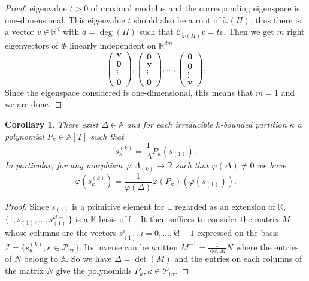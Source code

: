 \documentclass[10pt,a4paper]{amsart}
\newtheorem{coro}[theorem]{Corollary}
\theoremstyle{definition}
\DeclareMathOperator{\irr}{irr}
\begin{document}
\begin{proof}
eigenvalue $t>0$ of maximal modulus and the corresponding eigenspace is
one-dimensional. This eigenvalue $t$ should also be a root of $\widetilde
{\varphi}(\Pi)$, thus there is a vector $v\in\mathbb{R}^{d}$ with $d=\deg
(\Pi)$ such that $\mathcal{C}_{\widetilde{\varphi}(\Pi)}v=tv$. Then we get $m$
right eigenvectors of $\Phi$ linearly independent on $\mathbb{R}^{dm}$%
\[
\left(
\begin{matrix}
\boldsymbol{v}\\
\boldsymbol{0}\\
\vdots\\
\boldsymbol{0}%
\end{matrix}
\right) ,\left(
\begin{matrix}
\boldsymbol{0}\\
\boldsymbol{v}\\
\vdots\\
\boldsymbol{0}%
\end{matrix}
\right) ,\ldots,\left(
\begin{matrix}
\boldsymbol{0}\\
\boldsymbol{0}\\
\vdots\\
\boldsymbol{v}%
\end{matrix}
\right) .
\]
Since the eigenspace considered is one-dimensional, this means that $m=1$ and
we are done.
\end{proof}

\begin{coro}
\label{Cor_Delta}There exist $\Delta\in\mathbb{A}$ and for each irreducible
$k$-bounded partition $\kappa$ a polynomial $P_{\kappa}\in\mathbb{A}[T]$ such
that
\[
s_{\kappa}^{(k)}=\frac{1}{\Delta}P_{\kappa}(s_{(1)}).
\]
In particular, for any morphism $\varphi:\Lambda_{(k)}\rightarrow\mathbb{R}$
such that $\varphi(\Delta)\neq0$ we have%
\[
\varphi(s_{\kappa}^{(k)})=\frac{1}{\varphi(\Delta)}\varphi(P_{\kappa}%
)(\varphi(s_{(1)})).
\]

\end{coro}

\begin{proof}
Since $s_{(1)}$ is a primitive element for $\mathbb{L}$ regarded as an
extension of $\mathbb{K}$, $\{1,s_{(1)},\ldots,s_{(1)}^{k!-1}\}$ is a
$\mathbb{K}$-basis of $\mathbb{L}$.\ It then suffices to consider the matrix
$M$ whose columns are the vectors $s_{(1)}^{i},i=0,\ldots,k!-1$ expressed on
the basis $\mathcal{I}=\{s_{\kappa}^{(k)},\kappa\in\mathcal{P}_{\irr %
}\}$. Its inverse can be written $M^{-1}=\frac{1}{\det M}N$ where the entries
of $N$ belong to $\mathbb{A}$. So we have $\Delta=\det(M)$ and the entries on
each columns of the matrix $N$ give the polynomials $P_{\kappa},\kappa
\in\mathcal{P}_{\irr }$.
\end{proof}
\end{document}
